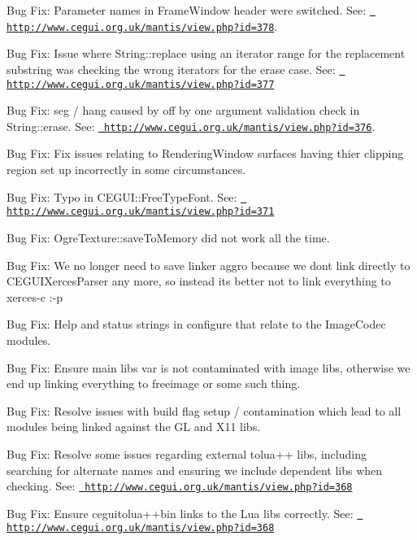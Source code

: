 \begin{DoxyItemize}
\item Bug Fix\+: Parameter names in Frame\+Window header were switched. See\+: \href{http://www.cegui.org.uk/mantis/view.php?id=378}{\texttt{ http\+://www.\+cegui.\+org.\+uk/mantis/view.\+php?id=378}}.
\item Bug Fix\+: Issue where String\+::replace using an iterator range for the replacement substring was checking the wrong iterators for the \textquotesingle{}erase\textquotesingle{} case. See\+: \href{http://www.cegui.org.uk/mantis/view.php?id=377}{\texttt{ http\+://www.\+cegui.\+org.\+uk/mantis/view.\+php?id=377}}
\item Bug Fix\+: seg / hang caused by off by one argument validation check in String\+::erase. See\+: \href{http://www.cegui.org.uk/mantis/view.php?id=376}{\texttt{ http\+://www.\+cegui.\+org.\+uk/mantis/view.\+php?id=376}}.
\item Bug Fix\+: Fix issues relating to Rendering\+Window surfaces having thier clipping region set up incorrectly in some circumstances.
\item Bug Fix\+: Typo in C\+E\+G\+U\+I\+::\+Free\+Type\+Font. See\+: \href{http://www.cegui.org.uk/mantis/view.php?id=371}{\texttt{ http\+://www.\+cegui.\+org.\+uk/mantis/view.\+php?id=371}}
\item Bug Fix\+: Ogre\+Texture\+::save\+To\+Memory did not work all the time.
\item Bug Fix\+: We no longer need to save linker aggro because we don\textquotesingle{}t link directly to C\+E\+G\+U\+I\+Xerces\+Parser any more, so instead it\textquotesingle{}s better not to link everything to xerces-\/c \+:-\/p
\item Bug Fix\+: Help and status strings in configure that relate to the Image\+Codec modules.
\item Bug Fix\+: Ensure main libs var is not contaminated with image libs, otherwise we end up linking everything to freeimage or some such thing.
\item Bug Fix\+: Resolve issues with build flag setup / contamination which lead to all modules being linked against the GL and X11 libs.
\item Bug Fix\+: Resolve some issues regarding external tolua++ libs, including searching for alternate names and ensuring we include dependent libs when checking. See\+: \href{http://www.cegui.org.uk/mantis/view.php?id=368}{\texttt{ http\+://www.\+cegui.\+org.\+uk/mantis/view.\+php?id=368}}
\item Bug Fix\+: Ensure ceguitolua++bin links to the Lua libs correctly. See\+: \href{http://www.cegui.org.uk/mantis/view.php?id=368}{\texttt{ http\+://www.\+cegui.\+org.\+uk/mantis/view.\+php?id=368}}

\end{DoxyItemize}
